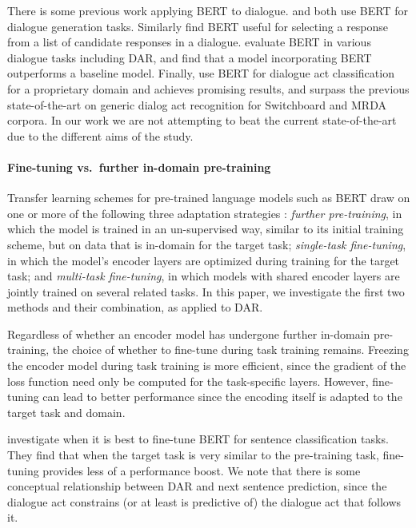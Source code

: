\documentclass[11pt,a4paper]{article}
\begin{document}
There is some previous work applying BERT to dialogue.
\citet{baoPLATOPretrainedDialogue2019} and \citet{chenSemanticallyConditionedDialog2019a} both use BERT for dialogue generation tasks.
Similarly \citet{vigComparisonTransferLearningApproaches2019} find BERT useful for selecting a response from a list of candidate responses in a dialogue.
\citet{mehriPretrainingMethodsDialog2019} evaluate BERT in various dialogue tasks including DAR, and find that a model incorporating BERT outperforms a baseline model.
Finally, \citet{chakravarty2019dialog} use BERT for dialogue act classification for a proprietary domain and achieves promising results, and \citet{ribeiro2019deep} surpass the previous state-of-the-art on generic dialog act recognition for Switchboard and MRDA corpora. In our work we are not attempting to beat the current state-of-the-art due to the different aims of the study.




\paragraph{Fine-tuning vs.~further in-domain pre-training}
Transfer learning schemes for pre-trained language models such as BERT draw on one or more of the following three adaptation strategies \citep{sunHowFineTuneBERT2019}:
\emph{further pre-training}, in which the model is trained in an un-supervised way, similar to its initial training scheme, but on data that is in-domain for the target task; 
\emph{single-task fine-tuning}, in which the model's encoder layers are optimized during training for the target task;
and \emph{multi-task fine-tuning}, in which models with shared encoder layers are jointly trained on several related tasks.
In this paper, we investigate the first two methods and their combination, as applied to DAR.

Regardless of whether an encoder model has undergone further in-domain pre-training, the choice of whether to fine-tune during task training remains.
Freezing the encoder model during task training is more efficient, since the gradient of the loss function need only be computed for the task-specific layers.
However, fine-tuning can lead to better performance since the encoding itself is adapted to the target task and domain.

\citet{petersTuneNotTune2019} investigate when it is best to fine-tune BERT for sentence classification tasks.
They find that when the target task is very similar to the pre-training task, fine-tuning provides less of a performance boost.
We note that there is some conceptual relationship between DAR and next sentence prediction, since the dialogue act constrains (or at least is predictive of) the dialogue act that follows it.
\end{document}
